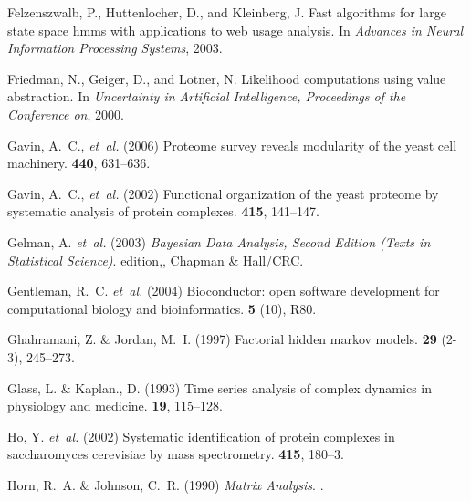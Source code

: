 \documentclass{bioinfo}
\begin{document}
\begin{thebibliography}{}
Felzenszwalb, P., Huttenlocher, D., and Kleinberg, J.
\newblock Fast algorithms for large state space hmms with applications to web
  usage analysis.
\newblock In {\em {Advances in Neural Information Processing Systems}}, 2003.

Friedman, N., Geiger, D., and Lotner, N. 
\newblock Likelihood computations using value abstraction.
\newblock In {\em {Uncertainty in Artificial Intelligence, Proceedings of the
  Conference on}}, 2000.

Gavin, A.~C., {\em et~al.} (2006{\em{}}) Proteome survey reveals
  modularity of the yeast cell machinery.
 {\bf 440}, 631--636.

Gavin, A.~C., {\em et~al.} (2002{\em{}}) Functional
  organization of the yeast proteome by systematic analysis of protein
  complexes.
 {\bf 415}, 141--147.

Gelman, A. {\em et~al.} (2003{\em{}}) {\em
  Bayesian Data Analysis, Second Edition (Texts in Statistical Science)}.
 edition,, Chapman \& Hall/CRC.

Gentleman, R.~C. {\em et~al.} (2004{\em{}}) Bioconductor: open software development for
  computational biology and bioinformatics.
 {\bf 5} (10), R80.

Ghahramani, Z. \& Jordan, M.~I. (1997{\em{}}) Factorial hidden markov models.
 {\bf 29} (2-3), 245--273.

Glass, L. \& Kaplan., D. (1993{\em{}}) Time series analysis of complex dynamics
  in physiology and medicine.
 {\bf 19}, 115--128.

Ho, Y. {\em et~al.} (2002{\em{}}) Systematic
  identification of protein complexes in saccharomyces cerevisiae by mass
  spectrometry.
 {\bf 415}, 180--3.

Horn, R.~A. \& Johnson, C.~R. (1990{\em{}}) {\em Matrix Analysis}.
.


\end{thebibliography}
\end{document}

